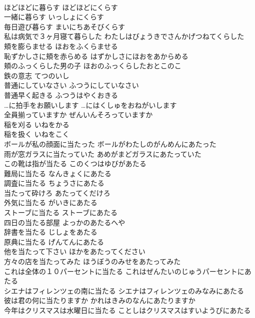 \documentclass[8pt]{extreport}
\begin{document}
\begin{CJK}{UTF8}{min}
\\	ほどほどに暮らす	ほどほどにくらす	
\\	一緒に暮らす	いっしょにくらす	
\\	毎日遊び暮らす	まいにちあそびくらす	
\\	私は病気で３ヶ月寝て暮らした	わたしはびょうきでさんかげつねてくらした	
\\	頬を膨らませる	ほおをふくらませる	
\\	恥ずかしさに頬を赤らめる	はずかしさにほおをあからめる	
\\	頬のふっくらした男の子	ほおのふっくらしたおとこのこ	
\\	鉄の意志	てつのいし	
\\	普通にしていなさい	ふつうにしていなさい	
\\	普通早く起きる	ふつうはやくおきる	
\\	…に拍手をお願いします	…にはくしゅをおねがいします	
\\	全員揃っていますか	ぜんいんそろっていますか	
\\	稲を刈る	いねをかる	
\\	稲を扱く	いねをこく	
\\	ボールが私の顔面に当たった	ボールがわたしのがんめんにあたった	
\\	雨が窓ガラスに当たっていた	あめがまどガラスにあたっていた	
\\	この靴は指が当たる	このくつはゆびがあたる	
\\	難局に当たる	なんきょくにあたる	
\\	調査に当たる	ちょうさにあたる	
\\	当たって砕けろ	あたってくだけろ	
\\	外気に当たる	がいきにあたる	
\\	ストーブに当たる	ストーブにあたる	
\\	四日の当たる部屋	よっかのあたるへや	
\\	辞書を当たる	じしょをあたる	
\\	原典に当たる	げんてんにあたる	
\\	他を当たって下さい	ほかをあたってください	
\\	方々の店を当たってみた	ほうぼうのみせをあたってみた	
\\	これは全体の１０パーセントに当たる	これはぜんたいのじゅうパーセントにあたる	
\\	シエナはフィレンツェの南に当たる	シエナはフィレンツェのみなみにあたる	
\\	彼は君の何に当たりますか	かれはきみのなんにあたりますか	
\\	今年はクリスマスは水曜日に当たる	ことしはクリスマスはすいようびにあたる	

\end{CJK}
\end{document}
